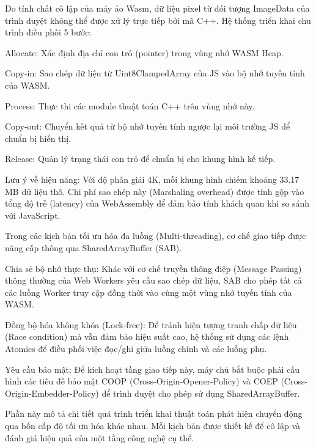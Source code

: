 
Do tính chất cô lập của máy ảo Wasm, dữ liệu pixel từ đối tượng ImageData của trình duyệt không thể được xử lý trực tiếp bởi mã C++. Hệ thống triển khai chu trình điều phối 5 bước:


Allocate: Xác định địa chỉ con trỏ (pointer) trong vùng nhớ WASM Heap.


Copy-in: Sao chép dữ liệu từ Uint8ClampedArray của JS vào bộ nhớ tuyến tính của WASM.


Process: Thực thi các module thuật toán C++ trên vùng nhớ này.


Copy-out: Chuyển kết quả từ bộ nhớ tuyến tính ngược lại môi trường JS để chuẩn bị hiển thị.


Release: Quản lý trạng thái con trỏ để chuẩn bị cho khung hình kế tiếp.


Lưu ý về hiệu năng: Với độ phân giải 4K, mỗi khung hình chiếm khoảng 33.17 MB dữ liệu thô. Chi phí sao chép này (Marshaling overhead) được tính gộp vào tổng độ trễ (latency) của WebAssembly để đảm bảo tính khách quan khi so sánh với JavaScript.



Trong các kịch bản tối ưu hóa đa luồng (Multi-threading), cơ chế giao tiếp được nâng cấp thông qua SharedArrayBuffer (SAB).


Chia sẻ bộ nhớ thực thụ: Khác với cơ chế truyền thông điệp (Message Passing) thông thường của Web Workers yêu cầu sao chép dữ liệu, SAB cho phép tất cả các luồng Worker truy cập đồng thời vào cùng một vùng nhớ tuyến tính của WASM.


Đồng bộ hóa không khóa (Lock-free): Để tránh hiện tượng tranh chấp dữ liệu (Race condition) mà vẫn đảm bảo hiệu suất cao, hệ thống sử dụng các lệnh Atomics để điều phối việc đọc/ghi giữa luồng chính và các luồng phụ.


Yêu cầu bảo mật: Để kích hoạt tầng giao tiếp này, máy chủ bắt buộc phải cấu hình các tiêu đề bảo mật COOP (Cross-Origin-Opener-Policy) và COEP (Cross-Origin-Embedder-Policy) để trình duyệt cho phép sử dụng SharedArrayBuffer.



Phần này mô tả chi tiết quá trình triển khai thuật toán phát hiện chuyển động qua bốn cấp độ tối ưu hóa khác nhau. Mỗi kịch bản được thiết kế để cô lập và đánh giá hiệu quả của một tầng công nghệ cụ thể.


